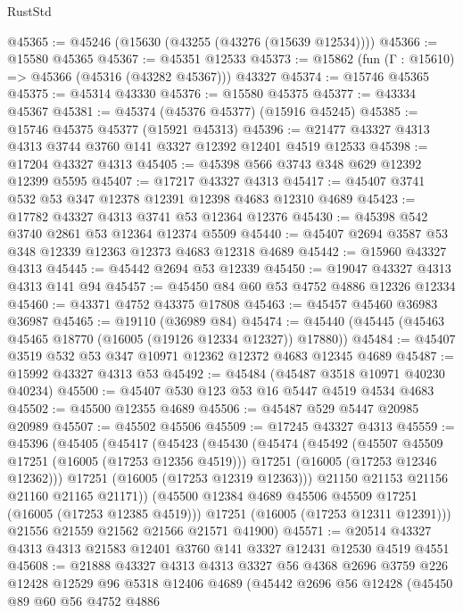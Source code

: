 \begin{lexlean}{RustStd}
\begin{coremodule}
@45365 := @45246 (@15630 (@43255 (@43276 (@15639 @12534))))
@45366 := @15580 @45365
@45367 := @45351 @12533
@45373 := @15862 (fun (Γ : @15610) => @45366 (@45316 (@43282 @45367))) @43327
@45374 := @15746 @45365
@45375 := @45314 @43330
@45376 := @15580 @45375
@45377 := @43334 @45367
@45381 := @45374 (@45376 @45377) (@15916 @45245)
@45385 := @15746 @45375 @45377 (@15921 @45313)
@45396 := @21477 @43327 @4313 @4313 @3744 @3760 @141 @3327 @12392 @12401 @4519 @12533
@45398 := @17204 @43327 @4313
@45405 := @45398 @566 @3743 @348 @629 @12392 @12399 @5595
@45407 := @17217 @43327 @4313
@45417 := @45407 @3741 @532 @53 @347 @12378 @12391 @12398 @4683 @12310 @4689
@45423 := @17782 @43327 @4313 @3741 @53 @12364 @12376
@45430 := @45398 @542 @3740 @2861 @53 @12364 @12374 @5509
@45440 := @45407 @2694 @3587 @53 @348 @12339 @12363 @12373 @4683 @12318 @4689
@45442 := @15960 @43327 @4313
@45445 := @45442 @2694 @53 @12339
@45450 := @19047 @43327 @4313 @4313 @141 @94
@45457 := @45450 @84 @60 @53 @4752 @4886 @12326 @12334
@45460 := @43371 @4752 @43375 @17808
@45463 := @45457 @45460 @36983 @36987
@45465 := @19110 (@36989 @84)
@45474 := @45440 (@45445 (@45463 @45465 @18770 (@16005 (@19126 @12334 @12327)) @17880))
@45484 := @45407 @3519 @532 @53 @347 @10971 @12362 @12372 @4683 @12345 @4689
@45487 := @15992 @43327 @4313 @53
@45492 := @45484 (@45487 @3518 @10971 @40230 @40234)
@45500 := @45407 @530 @123 @53 @16 @5447 @4519 @4534 @4683
@45502 := @45500 @12355 @4689
@45506 := @45487 @529 @5447 @20985 @20989
@45507 := @45502 @45506
@45509 := @17245 @43327 @4313
@45559 := @45396
    (@45405
      (@45417
        (@45423
          (@45430
            (@45474
              (@45492
                (@45507 @45509 @17251 (@16005 (@17253 @12356 @4519)))
                @17251
                (@16005 (@17253 @12346 @12362)))
              @17251
              (@16005 (@17253 @12319 @12363)))
            @21150
            @21153
            @21156
            @21160
            @21165
            @21171))
        (@45500 @12384 @4689 @45506 @45509 @17251 (@16005 (@17253 @12385 @4519)))
        @17251
        (@16005 (@17253 @12311 @12391)))
      @21556
      @21559
      @21562
      @21566
      @21571
      @41900)
@45571 := @20514 @43327 @4313 @4313 @21583 @12401 @3760 @141 @3327 @12431 @12530 @4519 @4551
@45608 := @21888
    @43327
    @4313
    @4313
    @3327
    @56
    @4368
    @2696
    @3759
    @226
    @12428
    @12529
    @96
    @5318
    @12406
    @4689
    (@45442
      @2696
      @56
      @12428
      (@45450
        @89
        @60
        @56
        @4752
        @4886

\end{coremodule}
\end{lexlean}
